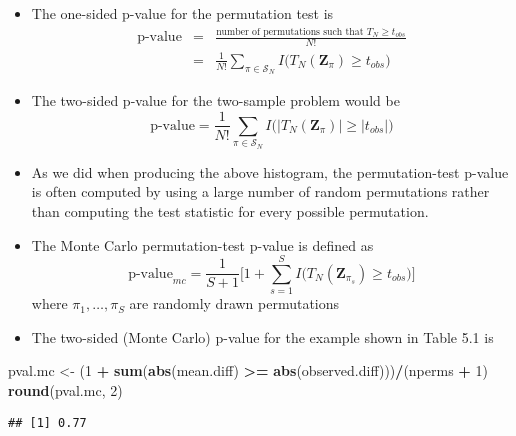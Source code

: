 \documentclass[]{book}
\newenvironment{Shaded}{\begin{snugshade}}{\end{snugshade}}
\newcommand{\DecValTok}[1]{\textcolor[rgb]{0.00,0.00,0.81}{#1}}
\newcommand{\KeywordTok}[1]{\textcolor[rgb]{0.13,0.29,0.53}{\textbf{#1}}}
\newcommand{\NormalTok}[1]{#1}
\newcommand{\OperatorTok}[1]{\textcolor[rgb]{0.81,0.36,0.00}{\textbf{#1}}}
\newcommand{\StringTok}[1]{\textcolor[rgb]{0.31,0.60,0.02}{#1}}
\begin{document}
\begin{itemize}
\item
  The one-sided p-value for the permutation test is
  \begin{eqnarray}
  \textrm{p-value} &=& \frac{\textrm{number of permutations such that } T_{N} \geq t_{obs}}{ N! } \nonumber \\
  &=& \frac{1}{N!} \sum_{\pi \in \mathcal{S}_{N}} I\Big( T_{N}(\mathbf{Z}_{\pi}) \geq t_{obs} \Big) \nonumber
  \end{eqnarray}
\item
  The two-sided p-value for the two-sample problem would be
  \begin{equation}
  \textrm{p-value} 
  = \frac{1}{N!} \sum_{\pi \in \mathcal{S}_{N}} I\Big( \Big| T_{N}(\mathbf{Z}_{\pi}) \Big|  \geq |t_{obs}| \Big) \nonumber
  \end{equation}
\item
  As we did when producing the above histogram, the permutation-test p-value is
  often computed by using a large number of random permutations rather
  than computing the test statistic for every possible permutation.
\item
  The Monte Carlo permutation-test p-value is defined as
  \begin{equation}
  \textrm{p-value}_{mc} = \frac{1}{S+1}\Bigg[ 1 +  \sum_{s = 1}^{S} I\Big( T_{N}(\mathbf{Z}_{\pi_{s}}) \geq t_{obs} \Big) \Bigg]
  \end{equation}
  where \(\pi_{1}, \ldots, \pi_{S}\) are randomly drawn permutations
\item
  The two-sided (Monte Carlo) p-value for the example shown in Table 5.1 is
\end{itemize}

\begin{Shaded}
\begin{Highlighting}[]
\NormalTok{pval.mc <-}\StringTok{ }\NormalTok{(}\DecValTok{1} \OperatorTok{+}\StringTok{ }\KeywordTok{sum}\NormalTok{(}\KeywordTok{abs}\NormalTok{(mean.diff) }\OperatorTok{>=}\StringTok{ }\KeywordTok{abs}\NormalTok{(observed.diff)))}\OperatorTok{/}\NormalTok{(nperms }\OperatorTok{+}\StringTok{ }\DecValTok{1}\NormalTok{)}
\KeywordTok{round}\NormalTok{(pval.mc, }\DecValTok{2}\NormalTok{)}
\end{Highlighting}
\end{Shaded}

\begin{verbatim}
## [1] 0.77
\end{verbatim}
\end{document}
